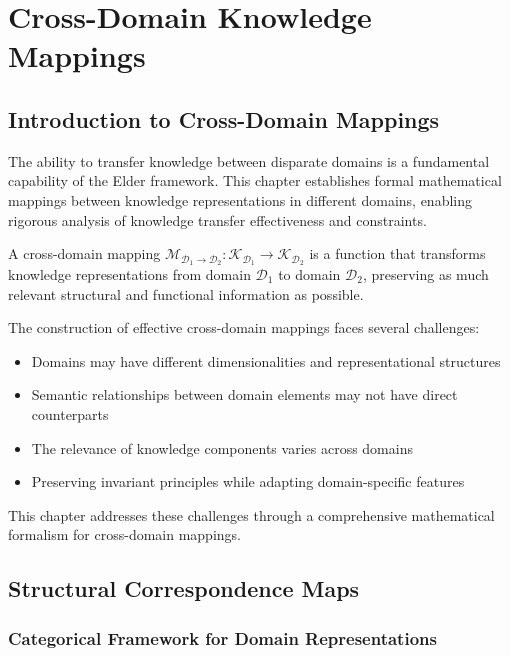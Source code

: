 \chapter{Cross-Domain Knowledge Mappings}

\section{Introduction to Cross-Domain Mappings}

The ability to transfer knowledge between disparate domains is a fundamental capability of the Elder framework. This chapter establishes formal mathematical mappings between knowledge representations in different domains, enabling rigorous analysis of knowledge transfer effectiveness and constraints.

\begin{definition}
A cross-domain mapping $\mathcal{M}_{\mathcal{D}_1 \rightarrow \mathcal{D}_2}: \mathcal{K}_{\mathcal{D}_1} \rightarrow \mathcal{K}_{\mathcal{D}_2}$ is a function that transforms knowledge representations from domain $\mathcal{D}_1$ to domain $\mathcal{D}_2$, preserving as much relevant structural and functional information as possible.
\end{definition}

The construction of effective cross-domain mappings faces several challenges:
\begin{itemize}
    \item Domains may have different dimensionalities and representational structures
    \item Semantic relationships between domain elements may not have direct counterparts
    \item The relevance of knowledge components varies across domains
    \item Preserving invariant principles while adapting domain-specific features
\end{itemize}

This chapter addresses these challenges through a comprehensive mathematical formalism for cross-domain mappings.

\section{Structural Correspondence Maps}

\subsection{Categorical Framework for Domain Representations}

